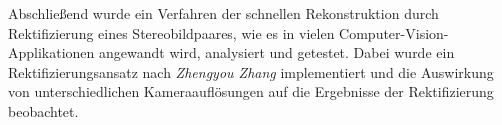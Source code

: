 Abschließend wurde ein Verfahren der schnellen Rekonstruktion durch Rektifizierung eines Stereobildpaares, wie es in vielen Computer-Vision-Applikationen angewandt wird, analysiert und getestet. Dabei wurde ein Rektifizierungsansatz nach \textit{Zhengyou Zhang} implementiert und die Auswirkung von unterschiedlichen Kameraauflösungen auf die Ergebnisse der Rektifizierung beobachtet.  



%
%
%
%
%


%


%
%
%
%
%
%





